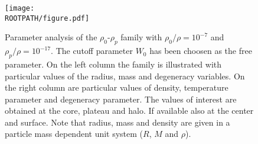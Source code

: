 \begin{figure}%
	\centering%
	\texttt{[image: \\ROOTPATH/figure.pdf]}
	\caption{Parameter analysis of the $\rho_0$-$\rho_p$ family with $\rho_0/\rho = 10^{-7}$ and $\rho_p/\rho = 10^{-17}$. The cutoff parameter $W_0$ has been choosen as the free parameter. On the left column the family is illustrated with particular values of the radius, mass and degeneracy variables. On the right column are particular values of density, temperature parameter and degeneracy parameter. The values of interest are obtained at the core, plateau and halo. If available also at the center and surface. Note that radius, mass and density are given in a particle mass dependent unit system ($R$, $M$ and $\rho$).}%
	\label{fig:analysis:with-cutoff:RHO0RHOp:raw}%
\end{figure}